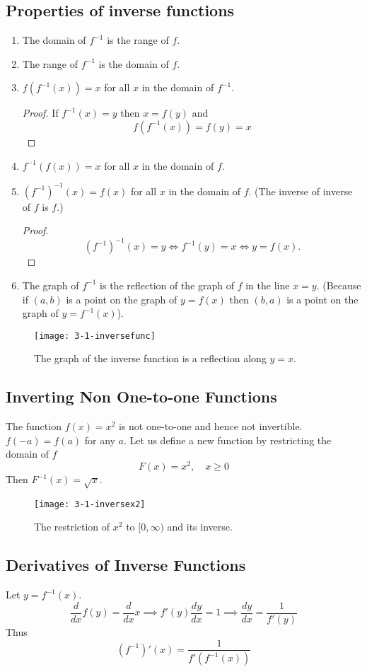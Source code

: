 \documentclass[../main.tex]{subfiles}
\begin{document}
\subsection*{Properties of inverse functions}
\begin{enumerate}
    \item The domain of $f^{-1}$ is the range of $f$.
    \item The range of $f^{-1}$ is the domain of $f$.
    \item $f(f^{-1}(x)) = x$ for all $x$ in the domain of $f^{-1}$.
    \begin{proof}
        If $f^{-1}(x) = y$ then $x = f(y)$ and
        \[
            f(f^{-1}(x)) = f(y) = x
        \]
    \end{proof}
    \item $f^{-1}(f(x)) = x$ for all $x$ in the domain of $f$.
    \item $(f^{-1})^{-1}(x) = f(x)$ for all $x$ in the domain of $f$. (The inverse of inverse of $f$ is $f$.)
    \begin{proof}
        \[
            (f^{-1})^{-1}(x) = y \iff f^{-1}(y) = x \iff y = f(x).
        \]
    \end{proof}
    \item The graph of $f^{-1}$ is the reflection of the graph of $f$ in the line $x=y$. (Because if $(a, b)$ is a point on the graph of $y=f(x)$ then $(b, a)$ is a point on the graph of $y = f^{-1}(x)$).
\end{enumerate}
\begin{figure}[H]
    \centering
    \texttt{[image: 3-1-inversefunc]}
    \caption{The graph of the inverse function is a reflection along $y=x$.}
\end{figure}

\subsection*{Inverting Non One-to-one Functions}
The function $f(x) = x^2$ is not one-to-one and hence not invertible. $f(-a) = f(a)$ for any $a$. Let us define a new function by restricting the domain of $f$
\[
    F(x) = x^2, \quad x \geq 0
\]
Then $F^{-1}(x) = \sqrt{x}$.
\begin{figure}[htbp]
    \centering
    \texttt{[image: 3-1-inversex2]}
    \caption{The restriction of $x^2$ to $[0, \infty)$ and its inverse.}
\end{figure}

\subsection*{Derivatives of Inverse Functions}
Let $y = f^{-1}(x)$.
\[
    \frac{d}{dx} f(y) = \frac{d}{dx} x \implies f'(y) \frac{dy}{dx} = 1 \implies \frac{dy}{dx} = \frac{1}{f'(y)}
\]
Thus
\[
    (f^{-1})'(x) = \frac{1}{f'(f^{-1}(x))}
\]
\end{document}
